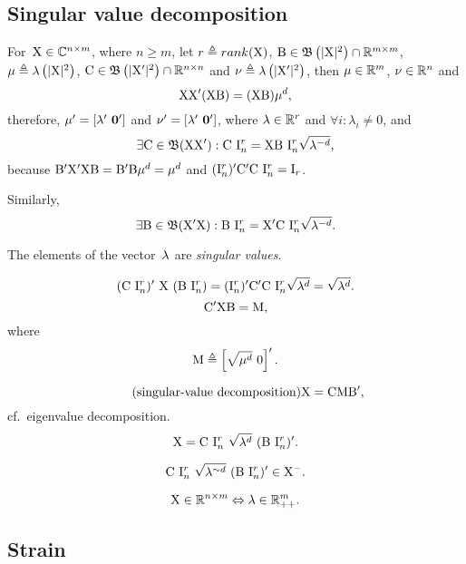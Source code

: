 \documentclass[10pt,a4paper]{article}
\theoremstyle{plain} \newtheorem{Lem}{Lemma}
\begin{document}
\subsection{Singular value decomposition}

For~$\mathrm X \in \mathbb C^{n \times m}$, where $n \ge m$,
let
$r \triangleq rank(\mathrm X)$,
$\mathrm B \in \mathfrak B\left(|\mathrm X|^2\right) \cap \mathbb R^{m \times m}$,    $\mathbf \mu \triangleq \lambda\left(|\mathrm X|^2\right)$,
$\mathrm C \in \mathfrak B\left(|\mathrm X'|^2\right) \cap \mathbb R^{n \times n}$ and $\mathbf \nu \triangleq \lambda\left(|\mathrm X'|^2\right)$,
then
$\mathbf \mu \in \mathbb R^m$,
$\mathbf \nu \in \mathbb R^n$
and
$$ \mathrm X \mathrm X' (\mathrm X \mathrm B) = (\mathrm X \mathrm B) \mathbf \mu^d, $$
therefore, $\mathbf \mu' = [\mathbf \lambda' \ \mathbf 0']$ and $\mathbf \nu' = [\mathbf \lambda' \ \mathbf 0']$, where $\mathbf \lambda \in \mathbb R^r$ and $\forall i : \lambda_i \ne 0$,
and
\begin{equation} \label{rectangular_eigenvectors}
\exists \mathrm C \in \mathfrak B(\mathrm X \mathrm X') : \mathrm C \ \mathrm I^r_n = \mathrm X \mathrm B \ \mathrm I^r_n \sqrt{\mathbf \lambda^{-d}},
\end{equation}
because $\mathrm B' \mathrm X' \mathrm X \mathrm B = \mathrm B' \mathrm B \mathbf \mu^d = \mathbf \mu^d$ and $(\mathrm I^r_n)' \mathrm C' \mathrm C \ \mathrm I^r_n = \mathrm I_r$.

Similarly,
$$ \exists \mathrm B \in \mathfrak B(\mathrm X' \mathrm X) : \mathrm B \ \mathrm I^r_n = \mathrm X' \mathrm C \ \mathrm I^r_n \sqrt{\mathbf \lambda^{-d}}. $$

The elements of the vector~$\mathbf \lambda$ are {\em singular values}.

$$ (\mathrm C \ \mathrm I^r_n)' \ \mathrm X \ (\mathrm B \ \mathrm I^r_n) = (\mathrm I^r_n)' \mathrm C ' \mathrm C \ \mathrm I^r_n \sqrt{\mathbf \lambda^d} = \sqrt{\mathbf \lambda^d}. $$
$$ \mathrm C' \mathrm X \mathrm B = \mathrm M, $$
where
$$ \mathrm M \triangleq \left[\sqrt{\mathbf \mu^d} \ \mathrm 0 \right]'. $$

\begin{equation*} \tag{singular-value decomposition}
  \mathrm X = \mathrm C \mathrm M \mathrm B',
\end{equation*}
cf.~eigenvalue decomposition.
$$ \mathrm X = \mathrm C \ \mathrm I^r_n \ \sqrt{\mathbf \lambda^d} \ (\mathrm B \ \mathrm I^r_n)'. $$

$$ \mathrm C \ \mathrm I^r_n \ \sqrt{\mathbf \lambda^{\sim d}} \ (\mathrm B \ \mathrm I^r_n)' \in \mathrm X^-. $$

$$ \mathrm X \in \mathbb R^{n \times m} \Leftrightarrow \mathbf \lambda \in \mathbb R_{++}^m. $$



\subsection{Strain}
\end{document}
